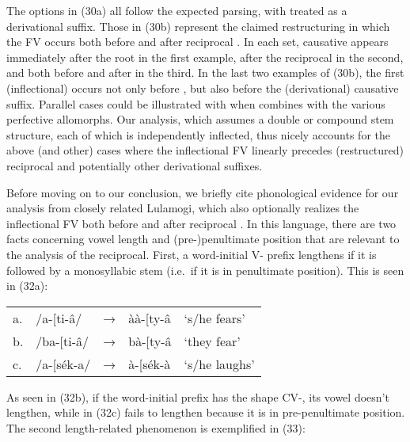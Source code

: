 \documentclass[output=paper,
modfonts
]{LSP/langsci}
\begin{document}
\noindent The options in (30a) all follow the expected parsing, with 
treated as a derivational suffix. Those in (30b) represent the claimed
restructuring in which the FV  occurs both before and after
reciprocal . In each set, causative  appears
immediately after the root in the first example, after the reciprocal in
the second, and both before and after in the third. In the last two
examples of (30b), the first (inflectional)  occurs not only
before , but also before the (derivational) causative
 suffix. Parallel cases could be illustrated with when
 combines with the various perfective allomorphs. Our
analysis, which assumes a double or compound stem structure, each of
which is independently inflected, thus nicely accounts for the above
(and other) cases where the inflectional FV linearly precedes
(restructured) reciprocal  and potentially other
derivational suffixes.

\ea
{}
\z

Before moving on to our conclusion, we briefly cite phonological
evidence for our analysis from closely related Lulamogi, which also
optionally realizes the inflectional FV both before and after reciprocal
 \citep{hymaninpress}. In this language, there are two facts
concerning vowel length and (pre-)penultimate position that are relevant
to the analysis of the reciprocal. First, a word-initial V- prefix
lengthens if it is followed by a monosyllabic stem (i.e.\ if it is in
penultimate position). This is seen in (32a):

\ea\begin{tabular}[t]{@{}lllll}
a. & /a-{[}ti-â/ & → & àà-{[}ty-â & `s/he fears' \\
b. & /ba-{[}ti-â/ & → & bà-{[}ty-â & `they fear' \\
c. & /a-{[}sék-a/ & → & à-{[}sék-à & `s/he laughs'
\end{tabular}
\z

\noindent As seen in (32b), if the word-initial prefix has the shape CV-, its
vowel doesn't lengthen, while in (32c)  fails to lengthen because it
is in pre-penultimate position. The second length-related phenomenon is
exemplified in (33):
\end{document}
